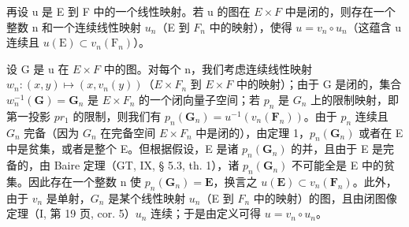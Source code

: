 再设 u 是 E 到 F 中的一个线性映射。若 u 的图在 \(E \times F\) 中是闭的，则存在一个整数 n 和一个连续线性映射 \(u_{n}\)（E 到 \(F_{n}\) 中的映射），使得 \(u = v_{n} \circ u_{n}\)（这蕴含 u 连续且 \(u(\mathrm{E}) \subset v_{n}(\mathrm{F}_{n})\)）。

设 G 是 u 在 \(E \times F\) 中的图。对每个 n，我们考虑连续线性映射 \(w_{n}:(x,y)\mapsto(x,v_{n}(y))\)（\(E \times F_{n}\) 到 \(E \times F\) 中的映射）；由于 G 是闭的，集合 \(w_{n}^{-1}(\mathbf{G})=\mathbf{G}_{n}\) 是 \(E \times F_{n}\) 的一个闭向量子空间；若 \(p_{n}\) 是 \(G_{n}\) 上的限制映射，即第一投影 \(pr_{1}\) 的限制，则我们有 \(p_{n}(\mathbf{G}_{n})=u^{-1}(v_{n}(\mathbf{F}_{n}))\)。由于 \(p_{n}\) 连续且 \(G_{n}\) 完备（因为 \(G_{n}\) 在完备空间 \(E \times F_{n}\) 中是闭的），由定理 1，\(p_{n}(\mathbf{G}_{n})\) 或者在 E 中是贫集，或者是整个 E。但根据假设，E 是诸 \(p_{n}(\mathbf{G}_{n})\) 的并，且由于 E 是完备的，由 Baire 定理（GT, IX, § 5.3, th. 1），诸 \(p_{n}(\mathbf{G}_{n})\) 不可能全是 E 中的贫集。因此存在一个整数 n 使 \(p_{n}(\mathbf{G}_{n}) = \mathbf{E}\)，换言之 \(u(\mathbf{E}) \subset v_{n}(\mathbf{F}_{n})\)。此外，由于 \(v_{n}\) 是单射，\(G_{n}\) 是某个线性映射 \(u_{n}\)（E 到 \(F_{n}\) 中的映射）的图，且由闭图像定理（I, 第 19 页, cor. 5）\(u_{n}\) 连续；于是由定义可得 \(u = v_{n} \circ u_{n}\)。

